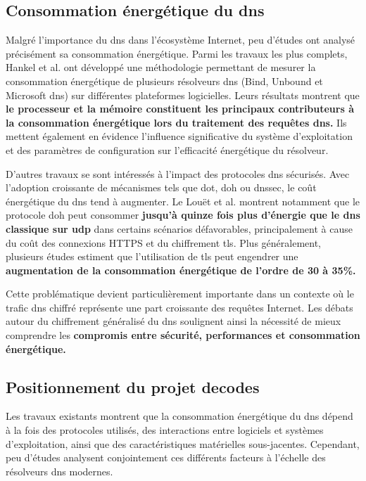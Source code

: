 \documentclass[12pt, a4paper]{report}
\begin{document}
	\subsection{Consommation énergétique du \gls{dns}}

	Malgré l'importance du \gls{dns} dans l'écosystème Internet, peu d'études ont analysé précisément sa consommation énergétique. Parmi les travaux les plus complets, Hankel et al. \cite{hankel2021dns_energy} ont développé une méthodologie permettant de mesurer la consommation énergétique de plusieurs résolveurs \gls{dns} (Bind, Unbound et Microsoft \gls{dns}) sur différentes plateformes logicielles. Leurs résultats montrent que \textbf{le processeur et la mémoire constituent les principaux contributeurs à la consommation énergétique lors du traitement des requêtes \gls{dns}.} Ils mettent également en évidence l'influence significative du système d'exploitation et des paramètres de configuration sur l'efficacité énergétique du résolveur.

	D'autres travaux se sont intéressés à l'impact des protocoles \gls{dns} sécurisés. Avec l'adoption croissante de mécanismes tels que \gls{dot}, \gls{doh} ou \gls{dnssec}, le coût énergétique du \gls{dns} tend à augmenter. Le Louët et al. \cite{lelouet2023doh_energy} montrent notamment que le protocole \gls{doh} peut consommer \textbf{jusqu'à quinze fois plus d'énergie que le \gls{dns} classique sur \gls{udp}} dans certains scénarios défavorables, principalement à cause du coût des connexions HTTPS et du chiffrement \gls{tls}. Plus généralement, plusieurs études estiment que l'utilisation de \gls{tls} peut engendrer une \textbf{augmentation de la consommation énergétique de l'ordre de 30 à 35\%.}

	Cette problématique devient particulièrement importante dans un contexte où le trafic \gls{dns} chiffré représente une part croissante des requêtes Internet. Les débats autour du chiffrement généralisé du \gls{dns} soulignent ainsi la nécessité de mieux comprendre les \textbf{compromis entre sécurité, performances et consommation énergétique.}

	\subsection{Positionnement du projet \gls{decodes}}

	Les travaux existants montrent que la consommation énergétique du \gls{dns} dépend à la fois des protocoles utilisés, des interactions entre logiciels et systèmes d'exploitation, ainsi que des caractéristiques matérielles sous-jacentes. Cependant, peu d'études analysent conjointement ces différents facteurs à l'échelle des résolveurs \gls{dns} modernes.
\end{document}
